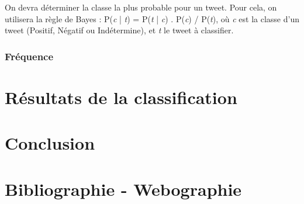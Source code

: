 \documentclass[pdftex,12pt,a4paper]{report}
\begin{document}
\begin{spacing}{1.2}
On devra déterminer la classe la plus probable pour un tweet. Pour cela, on utilisera la règle de Bayes : P(\textit{c} | \textit{t}) = P(\textit{t} | \textit{c}) . P(\textit{c}) / P(\textit{t}), où \textit{c} est la classe d'un tweet (Positif, Négatif ou Indétermine), et \textit{t} le tweet à classifier.

\subsection{Fréquence}

\chapter{Résultats de la classification}

\chapter{Conclusion}

\chapter*{Bibliographie - Webographie}

\end{spacing}
\end{document}
